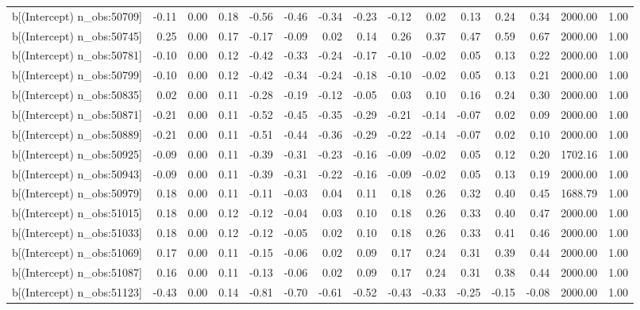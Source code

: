 \begin{table}[ht]
\begin{tabular}{rrrrrrrrrrrrrrr}
  b[(Intercept) n\_obs:50709] & -0.11 & 0.00 & 0.18 & -0.56 & -0.46 & -0.34 & -0.23 & -0.12 & 0.02 & 0.13 & 0.24 & 0.34 & 2000.00 & 1.00 \\ 
  b[(Intercept) n\_obs:50745] & 0.25 & 0.00 & 0.17 & -0.17 & -0.09 & 0.02 & 0.14 & 0.26 & 0.37 & 0.47 & 0.59 & 0.67 & 2000.00 & 1.00 \\ 
  b[(Intercept) n\_obs:50781] & -0.10 & 0.00 & 0.12 & -0.42 & -0.33 & -0.24 & -0.17 & -0.10 & -0.02 & 0.05 & 0.13 & 0.22 & 2000.00 & 1.00 \\ 
  b[(Intercept) n\_obs:50799] & -0.10 & 0.00 & 0.12 & -0.42 & -0.34 & -0.24 & -0.18 & -0.10 & -0.02 & 0.05 & 0.13 & 0.21 & 2000.00 & 1.00 \\ 
  b[(Intercept) n\_obs:50835] & 0.02 & 0.00 & 0.11 & -0.28 & -0.19 & -0.12 & -0.05 & 0.03 & 0.10 & 0.16 & 0.24 & 0.30 & 2000.00 & 1.00 \\ 
  b[(Intercept) n\_obs:50871] & -0.21 & 0.00 & 0.11 & -0.52 & -0.45 & -0.35 & -0.29 & -0.21 & -0.14 & -0.07 & 0.02 & 0.09 & 2000.00 & 1.00 \\ 
  b[(Intercept) n\_obs:50889] & -0.21 & 0.00 & 0.11 & -0.51 & -0.44 & -0.36 & -0.29 & -0.22 & -0.14 & -0.07 & 0.02 & 0.10 & 2000.00 & 1.00 \\ 
  b[(Intercept) n\_obs:50925] & -0.09 & 0.00 & 0.11 & -0.39 & -0.31 & -0.23 & -0.16 & -0.09 & -0.02 & 0.05 & 0.12 & 0.20 & 1702.16 & 1.00 \\ 
  b[(Intercept) n\_obs:50943] & -0.09 & 0.00 & 0.11 & -0.39 & -0.31 & -0.22 & -0.16 & -0.09 & -0.02 & 0.05 & 0.13 & 0.19 & 2000.00 & 1.00 \\ 
  b[(Intercept) n\_obs:50979] & 0.18 & 0.00 & 0.11 & -0.11 & -0.03 & 0.04 & 0.11 & 0.18 & 0.26 & 0.32 & 0.40 & 0.45 & 1688.79 & 1.00 \\ 
  b[(Intercept) n\_obs:51015] & 0.18 & 0.00 & 0.12 & -0.12 & -0.04 & 0.03 & 0.10 & 0.18 & 0.26 & 0.33 & 0.40 & 0.47 & 2000.00 & 1.00 \\ 
  b[(Intercept) n\_obs:51033] & 0.18 & 0.00 & 0.12 & -0.12 & -0.05 & 0.02 & 0.10 & 0.18 & 0.26 & 0.33 & 0.41 & 0.46 & 2000.00 & 1.00 \\ 
  b[(Intercept) n\_obs:51069] & 0.17 & 0.00 & 0.11 & -0.15 & -0.06 & 0.02 & 0.09 & 0.17 & 0.24 & 0.31 & 0.39 & 0.44 & 2000.00 & 1.00 \\ 
  b[(Intercept) n\_obs:51087] & 0.16 & 0.00 & 0.11 & -0.13 & -0.06 & 0.02 & 0.09 & 0.17 & 0.24 & 0.31 & 0.38 & 0.44 & 2000.00 & 1.00 \\ 
  b[(Intercept) n\_obs:51123] & -0.43 & 0.00 & 0.14 & -0.81 & -0.70 & -0.61 & -0.52 & -0.43 & -0.33 & -0.25 & -0.15 & -0.08 & 2000.00 & 1.00 \\ 

\end{tabular}
\end{table}
